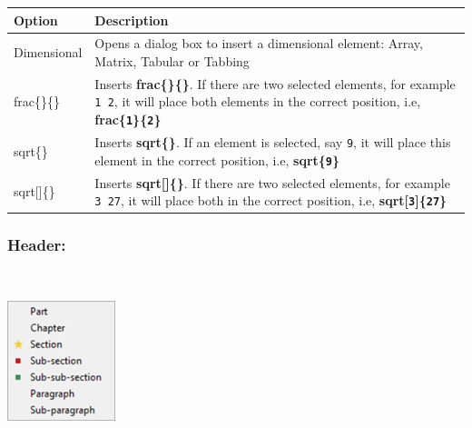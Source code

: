 \begin{scriptsize}
  \begin{tabularx}{\textwidth}{>{\hsize=0.2\hsize}X>{\hsize=0.8\hsize}X}\\
    \hline
    \textbf{Option} & \textbf{Description} \\
    \hline
    Dimensional & Opens a dialog box to insert a dimensional element: Array, Matrix, Tabular or Tabbing \\
    \hdashline[1pt/1pt]
    frac\{\}\{\} & Inserts \textbf{frac\{\}\{\}}. If there are two selected elements,
     for example \texttt{1 2}, it will place both elements in the correct position, i.e,
     \textbf{frac\{\texttt{1}\}\{\texttt{2}\}} \\
    sqrt\{\} & Inserts \textbf{sqrt\{\}}. If an element is selected, say \texttt{9},
     it will place this element in the correct position, i.e, \textbf{sqrt\{\texttt{9}\}} \\
    sqrt[]\{\} & Inserts \textbf{sqrt[]\{\}}. If there are two selected elements, for example
     \texttt{3 27}, it will place both in the correct position, i.e, \textbf{sqrt[\texttt{3}]\{\texttt{27}\}} \\
    \hline
  \end{tabularx}
\end{scriptsize}


\newpage
\hypertarget{menu_insert_latex_header}{}
\subsubsection{Header:}\\

\includegraphics[scale=0.8]{./res/menu_insert_latex_header.png}\\

